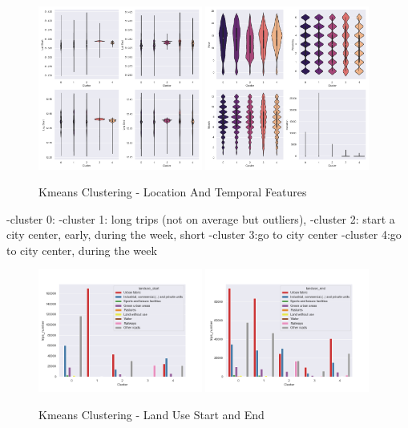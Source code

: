 \begin{figure}[htp]
    \centering
    \includegraphics[width=0.48\textwidth]{Figures/Clustering/clusters_lat_start.png}
    \includegraphics[width=0.48\textwidth]{Figures/Clustering/clusters_hour.png}
    \caption{Kmeans Clustering - Location And Temporal Features}
    \label{fig:kmeans_loc_temp}
\end{figure}

-cluster 0:
-cluster 1: long trips (not on average but outliers),
-cluster 2: start a city center, early, during the week, short
-cluster 3:go to city center
-cluster 4:go to city center, during the week

\begin{figure}[htp]
    \centering
    \includegraphics[width=0.48\textwidth]{Figures/Clustering/landuse_start.png}
    \includegraphics[width=0.48\textwidth]{Figures/Clustering/landuse_end.png}
    \caption{Kmeans Clustering - Land Use Start and End}
    \label{fig:kmeans_land_use}
\end{figure}

